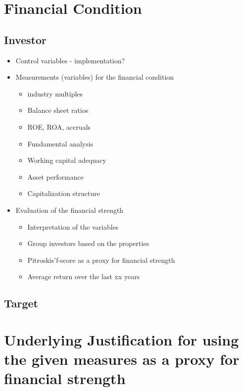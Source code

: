 \documentclass[12pt]{article}
\begin{document}
\section{Financial Condition}

\subsection{Investor}

    \begin{itemize}
        \item Control variables - implementation?
    
        \item Measurements (variables) for the financial condition 
    
            \begin{itemize}
            \item industry multiples
            \item Balance sheet ratios
            \item ROE, ROA, accruals 
            \item Fundamental analysis
            \item Working capital adequacy
            \item Asset performance
            \item Capitalization structure
            \end{itemize}
    
        \item Evaluation of the financial strength
    
            \begin{itemize}
            \item Interpretation of the variables
            \item Group investors based on the properties
            \item Pitroskis'f-score as a proxy for financial strength
            \item Average return over the last xx years 
            \end{itemize}

    
    \end{itemize}

\subsection{Target}

\section{Underlying Justification for using the given measures as a proxy for financial strength}
\end{document}

